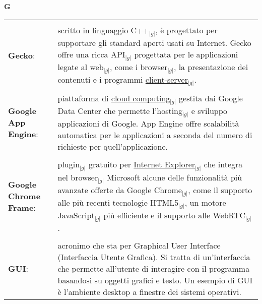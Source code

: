 \hfill\Huge{\textbf{G}}\\
\normalsize
\label{tabVers}
	\begin{longtable}{p{} p{}} 
	    \toprule
	    \\
	    \textbf{Gecko}:			&	scritto in linguaggio C++$_{|g|}$, è progettato per supportare gli standard aperti usati su Internet. Gecko offre una ricca API$_{|g|}$ progettata per le applicazioni 
							legate al web$_{|g|}$, come i browser$_{|g|}$, la presentazione dei contenuti e i programmi \underline{client-server}$_{|g|}$.\\
	    \\
	    \textbf{Google App }\newline
	    \textbf{Engine}:			& 	piattaforma di \underline{cloud computing}$_{|g|}$ gestita dai Google Data Center che permette l’hosting$_{|g|}$ e sviluppo applicazioni di Google. App Engine offre scalabilità automatica per le 
							applicazioni a seconda del numero di richieste per quell’applicazione.\\
	    \\
	    \textbf{Google Chrome }\newline
	    \textbf{Frame}:			& 	plugin$_{|g|}$ gratuito per \underline{Internet Explorer}$_{|g|}$ che integra nel browser$_{|g|}$ Microsoft alcune delle funzionalità più avanzate offerte da 
							Google Chrome$_{|g|}$, come il supporto alle più recenti tecnologie HTML5$_{|g|}$, un motore JavaScript$_{|g|}$ più efficiente e il supporto alle WebRTC$_{|g|}$.\\
	    \\
	    \textbf{GUI}:			&	acronimo che sta per Graphical User Interface (Interfaccia Utente Grafica). Si tratta di un’interfaccia che permette all’utente di interagire con il programma basandosi su oggetti 
							grafici e testo. Un esempio di GUI è l’ambiente desktop a finestre dei sistemi operativi.\\
	\end{longtable}
\newpage


